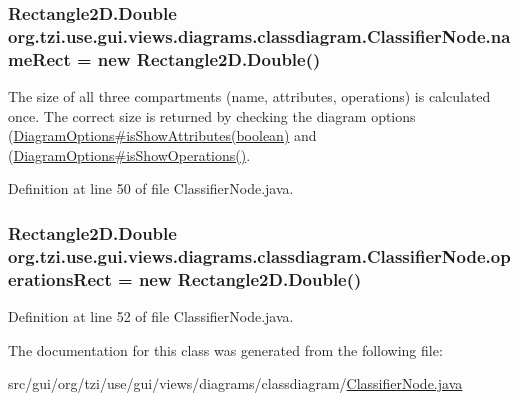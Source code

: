 \hypertarget{classorg_1_1tzi_1_1use_1_1gui_1_1views_1_1diagrams_1_1classdiagram_1_1_classifier_node_a8c89742792d99f95b2432b4a96f70566}{
\subsubsection[{name\-Rect}]{\setlength{\rightskip}{0pt plus 5cm}Rectangle2\-D.\-Double org.\-tzi.\-use.\-gui.\-views.\-diagrams.\-classdiagram.\-Classifier\-Node.\-name\-Rect = new Rectangle2\-D.\-Double()\hspace{0.3cm}{\ttfamily [protected]}}}\label{classorg_1_1tzi_1_1use_1_1gui_1_1views_1_1diagrams_1_1classdiagram_1_1_classifier_node_a8c89742792d99f95b2432b4a96f70566}
The size of all three compartments (name, attributes, operations) is calculated once. The correct size is returned by checking the diagram options (\hyperlink{}{Diagram\-Options\#is\-Show\-Attributes(boolean)} and (\hyperlink{classorg_1_1tzi_1_1use_1_1gui_1_1views_1_1diagrams_1_1_diagram_options_a177e8528f11080ae86b5f9a455f232c6}{Diagram\-Options\#is\-Show\-Operations()}. 

Definition at line 50 of file Classifier\-Node.\-java.

\hypertarget{classorg_1_1tzi_1_1use_1_1gui_1_1views_1_1diagrams_1_1classdiagram_1_1_classifier_node_a5f0ee530b78fa45045ebda6d4cb897cb}{
\subsubsection[{operations\-Rect}]{\setlength{\rightskip}{0pt plus 5cm}Rectangle2\-D.\-Double org.\-tzi.\-use.\-gui.\-views.\-diagrams.\-classdiagram.\-Classifier\-Node.\-operations\-Rect = new Rectangle2\-D.\-Double()\hspace{0.3cm}{\ttfamily [protected]}}}\label{classorg_1_1tzi_1_1use_1_1gui_1_1views_1_1diagrams_1_1classdiagram_1_1_classifier_node_a5f0ee530b78fa45045ebda6d4cb897cb}


Definition at line 52 of file Classifier\-Node.\-java.



The documentation for this class was generated from the following file\-:\begin{DoxyCompactItemize}
\item 
src/gui/org/tzi/use/gui/views/diagrams/classdiagram/\hyperlink{_classifier_node_8java}{Classifier\-Node.\-java}\end{DoxyCompactItemize}
